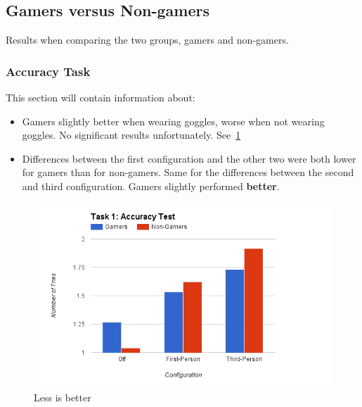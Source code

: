 \documentclass[runningheads,a4paper,oribibl]{llncs}
\begin{document}
\subsection{Gamers versus Non-gamers}
Results when comparing the two groups, gamers and non-gamers.
\subsubsection{Accuracy Task}
This section will contain information about:
\begin{itemize}
	\item Gamers slightly better when wearing goggles, worse when not wearing goggles. No significant results unfortunately. See~\ref{fig:Task1Graph}
	\item Differences between the first configuration and the other two were both lower for gamers than for non-gamers. Same for the differences between the second and third configuration. Gamers slightly performed \textbf{better}.
\end{itemize}

\begin{figure}
   \centering
   \includegraphics[width=\textwidth]{ExternalMaterial/Task1Graph}
   \caption{Less is better} \label{fig:Task1Graph}
\end{figure}
\end{document}
